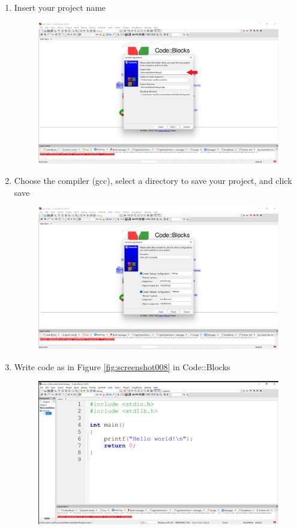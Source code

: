 \begin{enumerate}
\begin{figure}[H]
		      \caption{}
		      \label{fig:screenshot005}
	      \end{figure}
	\item Insert your project name
	      \begin{figure}[H]
		      \centering
		      \includegraphics[width=0.7\linewidth]{P1/img/screenshot006.png}
		      \caption{}
		      \label{fig:screenshot006}
	      \end{figure}
	\item Choose the compiler (gcc), select a directory to save your project, and click save
	      \begin{figure}[H]
		      \centering
		      \includegraphics[width=0.7\linewidth]{P1/img/screenshot007.png}
		      \caption{}
		      \label{fig:screenshot007}
	      \end{figure}
	\item Write code as in Figure \ref{fig:screenshot008} in Code::Blocks
	      \begin{figure}[H]
		      \centering
		      \includegraphics[width=0.7\linewidth]{P1/img/screenshot008.png}

\end{figure}
\end{enumerate}
